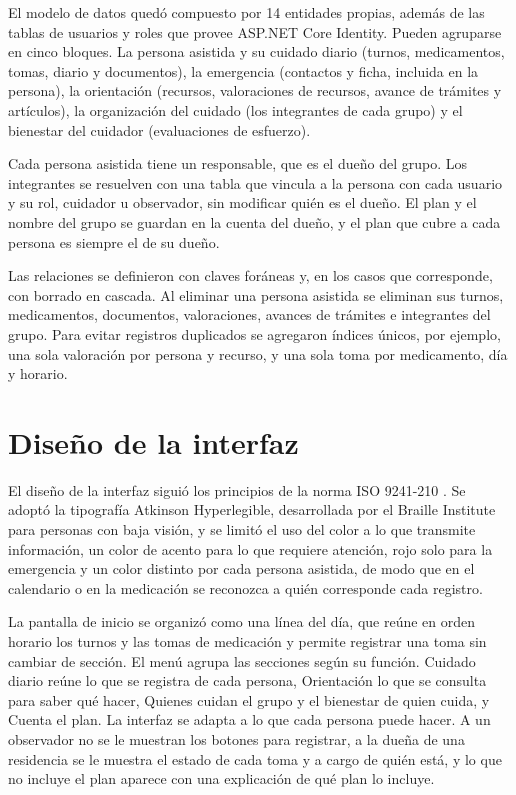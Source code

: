 El modelo de datos quedó compuesto por 14 entidades propias, además de las tablas de usuarios y roles que provee ASP.NET Core Identity. Pueden agruparse en cinco bloques. La persona asistida y su cuidado diario (turnos, medicamentos, tomas, diario y documentos), la emergencia (contactos y ficha, incluida en la persona), la orientación (recursos, valoraciones de recursos, avance de trámites y artículos), la organización del cuidado (los integrantes de cada grupo) y el bienestar del cuidador (evaluaciones de esfuerzo).

Cada persona asistida tiene un responsable, que es el dueño del grupo. Los integrantes se resuelven con una tabla que vincula a la persona con cada usuario y su rol, cuidador u observador, sin modificar quién es el dueño. El plan y el nombre del grupo se guardan en la cuenta del dueño, y el plan que cubre a cada persona es siempre el de su dueño.

Las relaciones se definieron con claves foráneas y, en los casos que corresponde, con borrado en cascada. Al eliminar una persona asistida se eliminan sus turnos, medicamentos, documentos, valoraciones, avances de trámites e integrantes del grupo. Para evitar registros duplicados se agregaron índices únicos, por ejemplo, una sola valoración por persona y recurso, y una sola toma por medicamento, día y horario.

\section{Diseño de la interfaz}

El diseño de la interfaz siguió los principios de la norma ISO 9241-210 \citep{une2019}. Se adoptó la tipografía Atkinson Hyperlegible, desarrollada por el Braille Institute para personas con baja visión, y se limitó el uso del color a lo que transmite información, un color de acento para lo que requiere atención, rojo solo para la emergencia y un color distinto por cada persona asistida, de modo que en el calendario o en la medicación se reconozca a quién corresponde cada registro.

La pantalla de inicio se organizó como una línea del día, que reúne en orden horario los turnos y las tomas de medicación y permite registrar una toma sin cambiar de sección. El menú agrupa las secciones según su función. Cuidado diario reúne lo que se registra de cada persona, Orientación lo que se consulta para saber qué hacer, Quienes cuidan el grupo y el bienestar de quien cuida, y Cuenta el plan. La interfaz se adapta a lo que cada persona puede hacer. A un observador no se le muestran los botones para registrar, a la dueña de una residencia se le muestra el estado de cada toma y a cargo de quién está, y lo que no incluye el plan aparece con una explicación de qué plan lo incluye.

